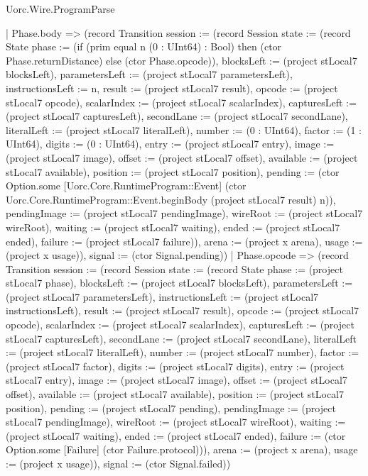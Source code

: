 \begin{lexlean}{Uorc.Wire.ProgramParse}
\begin{semanticmodule}
{    | Phase.body => (record Transition {session := (record Session {state := (record State {phase := (if (prim equal n (0 : UInt64) : Bool) then (ctor Phase.returnDistance) else (ctor Phase.opcode)), blocksLeft := (project stLocal7 blocksLeft), parametersLeft := (project stLocal7 parametersLeft), instructionsLeft := n, result := (project stLocal7 result), opcode := (project stLocal7 opcode), scalarIndex := (project stLocal7 scalarIndex), capturesLeft := (project stLocal7 capturesLeft), secondLane := (project stLocal7 secondLane), literalLeft := (project stLocal7 literalLeft), number := (0 : UInt64), factor := (1 : UInt64), digits := (0 : UInt64), entry := (project stLocal7 entry), image := (project stLocal7 image), offset := (project stLocal7 offset), available := (project stLocal7 available), position := (project stLocal7 position), pending := (ctor Option.some [Uorc.Core.RuntimeProgram::Event] (ctor Uorc.Core.RuntimeProgram::Event.beginBody (project stLocal7 result) n)), pendingImage := (project stLocal7 pendingImage), wireRoot := (project stLocal7 wireRoot), waiting := (project stLocal7 waiting), ended := (project stLocal7 ended), failure := (project stLocal7 failure)}), arena := (project x arena), usage := (project x usage)}), signal := (ctor Signal.pending)})
    | Phase.opcode => (record Transition {session := (record Session {state := (record State {phase := (project stLocal7 phase), blocksLeft := (project stLocal7 blocksLeft), parametersLeft := (project stLocal7 parametersLeft), instructionsLeft := (project stLocal7 instructionsLeft), result := (project stLocal7 result), opcode := (project stLocal7 opcode), scalarIndex := (project stLocal7 scalarIndex), capturesLeft := (project stLocal7 capturesLeft), secondLane := (project stLocal7 secondLane), literalLeft := (project stLocal7 literalLeft), number := (project stLocal7 number), factor := (project stLocal7 factor), digits := (project stLocal7 digits), entry := (project stLocal7 entry), image := (project stLocal7 image), offset := (project stLocal7 offset), available := (project stLocal7 available), position := (project stLocal7 position), pending := (project stLocal7 pending), pendingImage := (project stLocal7 pendingImage), wireRoot := (project stLocal7 wireRoot), waiting := (project stLocal7 waiting), ended := (project stLocal7 ended), failure := (ctor Option.some [Failure] (ctor Failure.protocol))}), arena := (project x arena), usage := (project x usage)}), signal := (ctor Signal.failed)})
}
\end{semanticmodule}
\end{lexlean}
